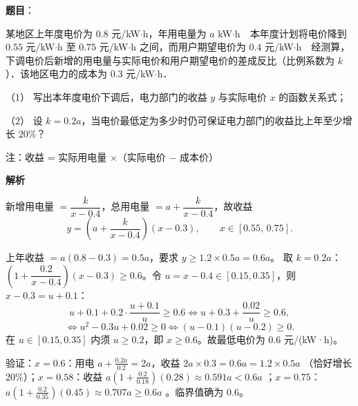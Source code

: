 \begin{answer}

\textbf{题目}：

某地区上年度电价为 $0.8$ 元/kW$\cdot$h，年用电量为 $a$ kW$\cdot$h　本年度计划将电价降到 $0.55$ 元/kW$\cdot$h 至 $0.75$ 元/kW$\cdot$h 之间，而用户期望电价为 $0.4$ 元/kW$\cdot$h　经测算，下调电价后新增的用电量与实际电价和用户期望电价的差成反比（比例系数为 $k$）．该地区电力的成本为 $0.3$ 元/kW$\cdot$h．

（1） 写出本年度电价下调后，电力部门的收益 $y$ 与实际电价 $x$ 的函数关系式；

（2） 设 $k = 0.2a$，当电价最低定为多少时仍可保证电力部门的收益比上年至少增长 $20\%$？

注：收益 = 实际用电量 ×（实际电价 $-$ 成本价）

\textbf{解析}


新增用电量 $=\dfrac{k}{x-0.4}$，总用电量 $=a+\dfrac{k}{x-0.4}$，故收益
\nopagebreak[4]
\[y=\left(a+\frac{k}{x-0.4}\right)(x-0.3),\qquad x\in[0.55,\,0.75].\]

上年收益 $=a(0.8-0.3)=0.5a$，要求 $y\ge1.2\times0.5a=0.6a$。
取 $k=0.2a$：$\left(1+\dfrac{0.2}{x-0.4}\right)(x-0.3)\ge0.6$。令 $u=x-0.4\in[0.15,0.35]$，则 $x-0.3=u+0.1$：
\nopagebreak[4]
\[u+0.1+0.2\cdot\frac{u+0.1}{u}\ge0.6\iff u+0.3+\frac{0.02}{u}\ge0.6,\]
\nopagebreak[4]
\[\iff u^2-0.3u+0.02\ge0\iff(u-0.1)(u-0.2)\ge0.\]
在 $u\in[0.15,0.35]$ 内须 $u\ge0.2$，即 $x\ge0.6$。故最低电价为 $0.6$ 元/(kW·h)。

验证：$x=0.6$：用电 $a+\frac{0.2a}{0.2}=2a$，收益 $2a\times0.3=0.6a=1.2\times0.5a$ （恰好增长 20\%）；$x=0.58$：收益 $a(1+\frac{0.2}{0.18})(0.28)\approx0.591a<0.6a$ ；$x=0.75$：$a(1+\frac{0.2}{0.35})(0.45)\approx0.707a\ge0.6a$ 。临界值确为 $0.6$。



\par\medskip

\end{answer}